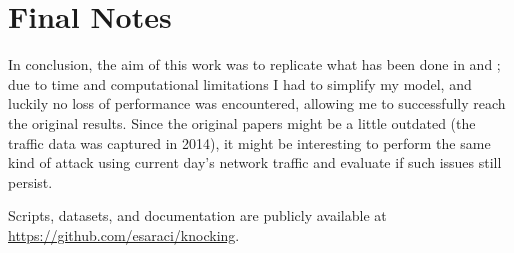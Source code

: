  \section{Final Notes}
 In conclusion, the aim of this work was to replicate what has been done in \cite{contiknocking} and \cite{contianalysis}; due to time and computational limitations I had to simplify my model, and luckily no loss of performance was encountered, allowing me to successfully reach the original results. Since the original papers might be a little outdated (the traffic data was captured in 2014), it might be interesting to perform the same kind of attack using current day's network traffic and evaluate if such issues still persist.
 

 Scripts, datasets, and documentation are publicly available at \url{https://github.com/esaraci/knocking}.
